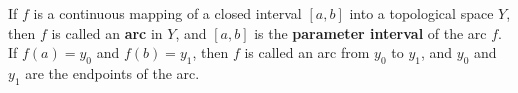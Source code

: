 If $f$ is a continuous mapping of a closed interval $[a, b]$ into a topological space $Y$, then $f$ is called an \textbf{arc} in $Y$, and $[a, b]$ is the \textbf{parameter interval} of the arc $f$. If $f(a) = y_0$ and $f(b) = y_1$, then $f$ is called an arc from $y_0$ to $y_1$, and $y_0$ and $y_1$ are the endpoints of the arc.
